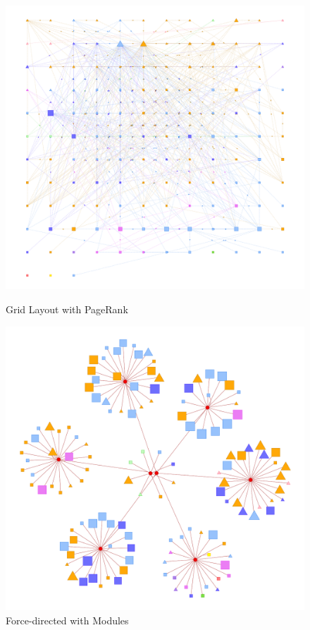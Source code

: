 \begin{figure}[tp]
  \begin{minipage}{0.5\textwidth-0.5em}
    \centering
    \includegraphics[width=\textwidth]{img/regexp/grid.png}
    \caption{Grid Layout with PageRank}\label{fig:regexp:grid}
  \end{minipage}%
  \hspace{1em}%
  \begin{minipage}{0.5\textwidth-0.5em}
    \centering
    \includegraphics[width=\textwidth]{img/regexp/module.png}
    \caption{Force-directed with Modules}\label{fig:regexp:module}
  \end{minipage}
\end{figure}

